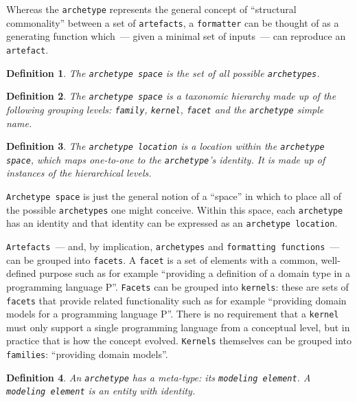 \documentclass{book}
\newtheorem{concept}{Definition}
\begin{document}
Whereas the \texttt{archetype} represents the general concept of
``structural commonality'' between a set of \texttt{artefacts}, a
\texttt{formatter} can be thought of as a generating function
which~--- given a minimal set of inputs~--- can reproduce an
\texttt{artefact}.

\begin{concept}
The \texttt{archetype space} is the set of all possible
\texttt{archetypes}.
\end{concept}

\begin{concept}
  The \texttt{archetype space} is a taxonomic hierarchy made up of the
  following grouping levels: \texttt{family}, \texttt{kernel},
  \texttt{facet} and the \texttt{archetype} simple name.
\end{concept}

\begin{concept}
The \texttt{archetype location} is a location within the
\texttt{archetype space}, which maps one-to-one to the
\texttt{archetype}'s identity. It is made up of instances of the
hierarchical levels.
\end{concept}

\texttt{Archetype space} is just the general notion of a ``space'' in
which to place all of the possible \texttt{archetypes} one might
conceive. Within this space, each \texttt{archetype} has an identity
and that identity can be expressed as an \texttt{archetype location}.

\texttt{Artefacts}~--- and, by implication, \texttt{archetypes} and
\texttt{formatting functions}~--- can be grouped into
\texttt{facets}. A \texttt{facet} is a set of elements with a common,
well-defined purpose such as for example ``providing a definition of a
domain type in a programming language P''. \texttt{Facets} can be
grouped into \texttt{kernels}: these are sets of \texttt{facets} that
provide related functionality such as for example ``providing domain
models for a programming language P''. There is no requirement that a
\texttt{kernel} must only support a single programming language from a
conceptual level, but in practice that is how the concept evolved.
\texttt{Kernels} themselves can be grouped into \texttt{families}:
``providing domain models''.

\begin{concept}
An \texttt{archetype} has a meta-type: its \texttt{modeling
  element}. A \texttt{modeling element} is an entity with
identity.
\end{concept}
\end{document}
